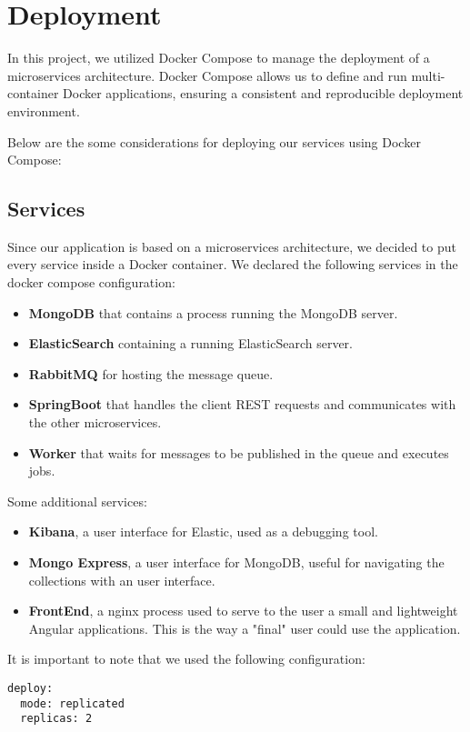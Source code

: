 \section{Deployment}
\label{ch:depl}

In this project, we utilized Docker Compose to manage the deployment of a
microservices architecture. Docker Compose allows us to define and run
multi-container Docker applications, ensuring a consistent and reproducible
deployment environment.

Below are the some considerations for
deploying our services using Docker Compose:

\subsection{Services}
Since our application is based on a microservices architecture, we decided
to put every service inside a Docker container.
We declared the following services in the docker compose configuration:
\begin{itemize}
        \item \textbf{MongoDB} that contains a process running the MongoDB server.
        \item \textbf{ElasticSearch} containing a running ElasticSearch server.
        \item \textbf{RabbitMQ} for hosting the message queue.
        \item \textbf{SpringBoot} that handles the client REST requests and
                communicates with the other microservices.
        \item \textbf{Worker} that waits for messages to be published in the
                queue and executes jobs.
\end{itemize}
Some additional services:
\begin{itemize}
        \item \textbf{Kibana}, a user interface for Elastic, used as a debugging
                tool.
        \item \textbf{Mongo Express}, a user interface for MongoDB, useful
                for navigating the collections with an user interface.
        \item \textbf{FrontEnd}, a nginx process used to serve to the user
                a small and lightweight Angular applications. This is the
                way a "final" user could use the application.
\end{itemize}

It is important to note that we used the following configuration:
\begin{lstlisting}[frame=single,caption=Replicas of a services,label=replicas]
deploy:
  mode: replicated
  replicas: 2
\end{lstlisting}

